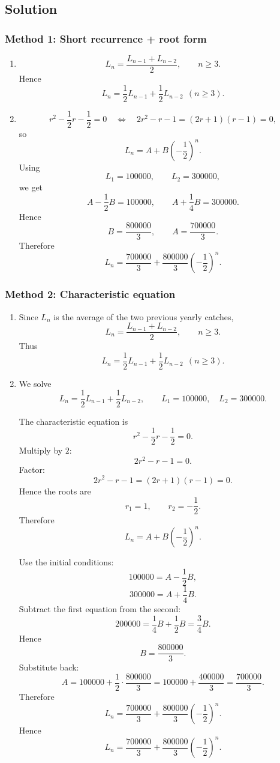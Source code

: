 \documentclass[12pt]{article}
\begin{document}
\subsection{Solution}

\subsubsection*{Method 1: Short recurrence + root form}
\begin{enumerate}[label=(\alph*)]
\item
\[
L_n=\frac{L_{n-1}+L_{n-2}}{2}, \qquad n\ge 3.
\]
Hence
\[
\boxed{L_n=\frac12L_{n-1}+\frac12L_{n-2}\ \ (n\ge 3).}
\]

\item
\[
r^2-\frac12r-\frac12=0
\quad\Longleftrightarrow\quad
2r^2-r-1=(2r+1)(r-1)=0,
\]
so
\[
L_n=A+B\left(-\frac12\right)^n.
\]
Using
\[
L_1=100000,\qquad L_2=300000,
\]
we get
\[
A-\frac12B=100000,\qquad A+\frac14B=300000.
\]
Hence
\[
B=\frac{800000}{3},\qquad A=\frac{700000}{3}.
\]
Therefore
\[
\boxed{L_n=\frac{700000}{3}+\frac{800000}{3}\left(-\frac12\right)^n.}
\]
\end{enumerate}

\subsubsection*{Method 2: Characteristic equation}
\begin{enumerate}[label=(\alph*)]
\item Since \(L_n\) is the average of the two previous yearly catches,
\[
L_n=\frac{L_{n-1}+L_{n-2}}{2}, \qquad n\ge 3.
\]
Thus
\[
\boxed{L_n=\frac12 L_{n-1}+\frac12 L_{n-2}\ \ (n\ge 3).}
\]

\item We solve
\[
L_n=\frac12 L_{n-1}+\frac12 L_{n-2}, \qquad L_1=100000,\quad L_2=300000.
\]

The characteristic equation is
\[
r^2-\frac12 r-\frac12=0.
\]
Multiply by \(2\):
\[
2r^2-r-1=0.
\]
Factor:
\[
2r^2-r-1=(2r+1)(r-1)=0.
\]
Hence the roots are
\[
r_1=1,\qquad r_2=-\frac12.
\]
Therefore
\[
L_n=A+B\left(-\frac12\right)^n.
\]

Use the initial conditions:
\[
100000=A-\frac12 B,
\]
\[
300000=A+\frac14 B.
\]
Subtract the first equation from the second:
\[
200000=\frac14 B+\frac12 B=\frac34 B.
\]
Hence
\[
B=\frac{800000}{3}.
\]
Substitute back:
\[
A=100000+\frac12\cdot \frac{800000}{3}
=100000+\frac{400000}{3}
=\frac{700000}{3}.
\]
Therefore
\[
L_n=\frac{700000}{3}+\frac{800000}{3}\left(-\frac12\right)^n.
\]
Hence
\[
\boxed{L_n=\frac{700000}{3}+\frac{800000}{3}\left(-\frac12\right)^n.}
\]
\end{enumerate}
\end{document}
